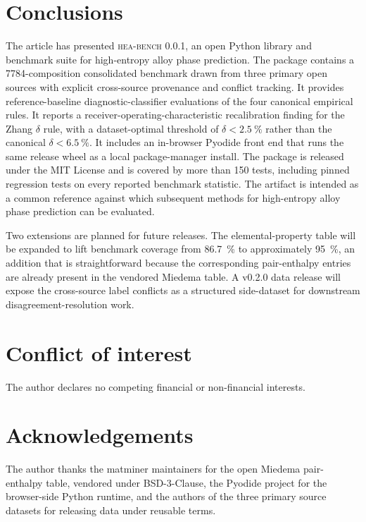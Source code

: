 \documentclass[review,times,nonatbib]{elsarticle}
\newcommand{\hea}{\textsc{hea-bench}\xspace}
\begin{document}
\section{Conclusions}

The article has presented \hea{} 0.0.1, an open Python library and
benchmark suite for high-entropy alloy phase prediction. The
package contains a \num{7784}-composition consolidated benchmark
drawn from three primary open sources with explicit cross-source
provenance and conflict tracking. It provides reference-baseline
diagnostic-classifier evaluations of the four canonical empirical
rules. It reports a receiver-operating-characteristic recalibration
finding for the Zhang $\delta$ rule, with a dataset-optimal
threshold of $\delta < \SI{2.5}{\percent}$ rather than the
canonical $\delta < \SI{6.5}{\percent}$. It includes an
in-browser Pyodide front end that runs the same release wheel as a
local package-manager install. The package is released under the
MIT License and is covered by more than 150 tests, including
pinned regression tests on every reported benchmark statistic. The
artifact is intended as a common reference against which subsequent
methods for high-entropy alloy phase prediction can be evaluated.

Two extensions are planned for future releases. The elemental-property
table will be expanded to lift benchmark coverage from
\SI{86.7}{\percent} to approximately \SI{95}{\percent}, an addition
that is straightforward because the corresponding pair-enthalpy
entries are already present in the vendored Miedema table. A v0.2.0
data release will expose the cross-source label conflicts as a
structured side-dataset for downstream disagreement-resolution work.

\section*{Conflict of interest}

The author declares no competing financial or non-financial
interests.

\section*{Acknowledgements}

The author thanks the matminer maintainers for the open Miedema
pair-enthalpy table, vendored under BSD-3-Clause, the Pyodide
project for the browser-side Python runtime, and the authors of
the three primary source datasets for releasing data under
reusable terms.

\printbibliography
\end{document}
